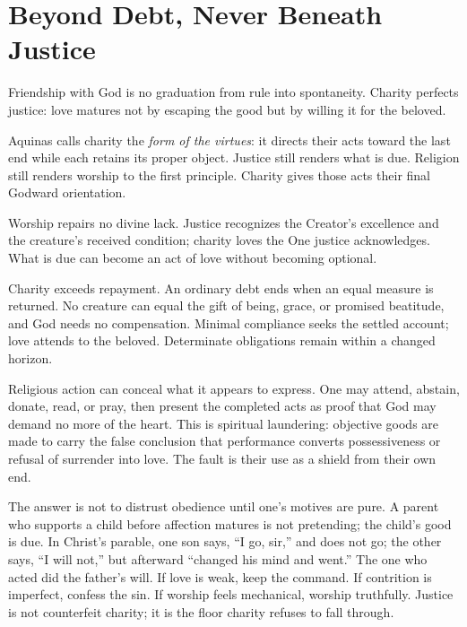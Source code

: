 \section{Beyond Debt, Never Beneath Justice}

Friendship with God is no graduation from rule into spontaneity. Charity perfects justice: love matures not by escaping the good but by willing it for the beloved.

Aquinas calls charity the \emph{form of the virtues}: it directs their acts toward the last end while each retains its proper object. Justice still renders what is due. Religion still renders worship to the first principle. Charity gives those acts their final Godward orientation.

Worship repairs no divine lack. Justice recognizes the Creator's excellence and the creature's received condition; charity loves the One justice acknowledges. What is due can become an act of love without becoming optional.

Charity exceeds repayment. An ordinary debt ends when an equal measure is returned. No creature can equal the gift of being, grace, or promised beatitude, and God needs no compensation. Minimal compliance seeks the settled account; love attends to the beloved. Determinate obligations remain within a changed horizon.

Religious action can conceal what it appears to express. One may attend, abstain, donate, read, or pray, then present the completed acts as proof that God may demand no more of the heart. This is spiritual laundering: objective goods are made to carry the false conclusion that performance converts possessiveness or refusal of surrender into love. The fault is their use as a shield from their own end.

The answer is not to distrust obedience until one's motives are pure. A parent who supports a child before affection matures is not pretending; the child's good is due. In Christ's parable, one son says, ``I go, sir,'' and does not go; the other says, ``I will not,'' but afterward ``changed his mind and went.'' The one who acted did the father's will. If love is weak, keep the command. If contrition is imperfect, confess the sin. If worship feels mechanical, worship truthfully. Justice is not counterfeit charity; it is the floor charity refuses to fall through.


